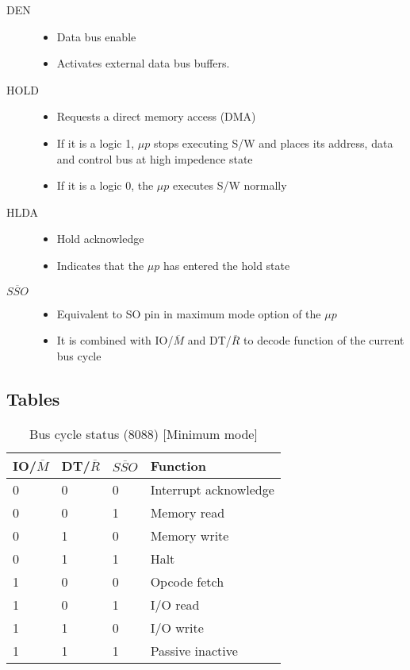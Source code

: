 \documentclass{article}
\begin{document}
\begin{description}
  \item[DEN]
  \begin{itemize}
      \item Data bus enable
      \item Activates external data bus buffers.
  \end{itemize}

  \item[HOLD]
  \begin{itemize}
      \item Requests a direct memory access (DMA)
      \item If it is a logic 1, $\mu p$ stops executing S/W and places its address, data and control
      bus at high impedence state
      \item If it is a logic 0, the $\mu p$ executes S/W normally
  \end{itemize}

  \item[HLDA]
  \begin{itemize}
      \item Hold acknowledge
      \item Indicates that the $\mu p$ has entered the hold state
  \end{itemize}

  \item[$\overline{SSO}$]
  \begin{itemize}
      \item Equivalent to SO pin in maximum mode option of the $\mu p$
      \item It is combined with IO/$\overline{M}$ and DT/$\overline{R}$ to decode function of the current bus cycle
  \end{itemize}

\end{description}
\newpage
\subsection{Tables}

\begin{table}[h!]
\centering
\begin{tabular}{ |p{1cm}|p{1cm}|p{1cm}|p{3cm}|  }
\hline
IO/$ \overline{M} $ & DT/$ \overline{R} $ & $ \overline{SSO} $& Function   \\
\hline
0 & 0 & 0 & Interrupt acknowledge \\
0 & 0 & 1 & Memory read \\
0 & 1 & 0 & Memory write \\
0 & 1 & 1 & Halt \\
1 & 0 & 0 & Opcode fetch \\
1 & 0 & 1 & I/O read \\
1 & 1 & 0 & I/O write \\
1 & 1 & 1 & Passive inactive \\
\hline
\end{tabular}

\caption{Bus cycle status (8088) [Minimum mode]}
\label{table:1}
\end{table}
\end{document}

